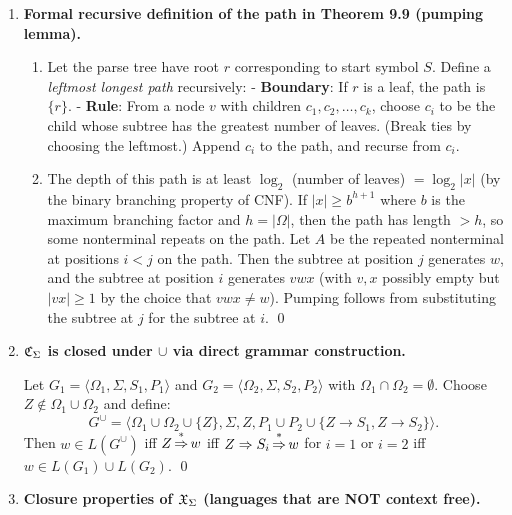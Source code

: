 \begin{enumerate}[{9.}1. ]
\textbf{Grammar}: $S \to \pmb{0}S\pmb{1} \mid \pmb{1}S\pmb{0} \mid SS \mid \lambda$.

\textbf{Proof}: By induction, any string with equal numbers of $\pmb{0}$s and $\pmb{1}$s is derivable, and all derivations yield strings with equal counts. So $L(G) = L$. \qed

\item \textbf{Formal recursive definition of the path in Theorem 9.9 (pumping lemma).}

\begin{enumerate}
\item Let the parse tree have root $r$ corresponding to start symbol $S$. Define a \emph{leftmost longest path} recursively:
  - \textbf{Boundary}: If $r$ is a leaf, the path is $\{r\}$.
  - \textbf{Rule}: From a node $v$ with children $c_1, c_2, \ldots, c_k$, choose $c_i$ to be the child whose subtree has the greatest number of leaves. (Break ties by choosing the leftmost.) Append $c_i$ to the path, and recurse from $c_i$.

\item The depth of this path is at least $\log_2$ (number of leaves) $= \log_2 |x|$ (by the binary branching property of CNF). If $|x| \geq b^{h+1}$ where $b$ is the maximum branching factor and $h = |\Omega|$, then the path has length $> h$, so some nonterminal repeats on the path. Let $A$ be the repeated nonterminal at positions $i < j$ on the path. Then the subtree at position $j$ generates $w$, and the subtree at position $i$ generates $vwx$ (with $v,x$ possibly empty but $|vx|\geq 1$ by the choice that $vwx \neq w$). Pumping follows from substituting the subtree at $j$ for the subtree at $i$. \qed
\end{enumerate}

\item \textbf{$\mathfrak{C}_\Sigma$ is closed under $\cup$ via direct grammar construction.}

Let $G_1 = \langle\Omega_1,\Sigma,S_1,P_1\rangle$ and $G_2 = \langle\Omega_2,\Sigma,S_2,P_2\rangle$ with $\Omega_1\cap\Omega_2=\emptyset$. Choose $Z \notin \Omega_1\cup\Omega_2$ and define:
\[
G^\cup = \langle\Omega_1\cup\Omega_2\cup\{Z\},\Sigma,Z,P_1\cup P_2\cup\{Z\to S_1,Z\to S_2\}\rangle.
\]
Then $w \in L(G^\cup)$ iff $Z \operatorname{\overset{*}{\Rightarrow}} w$ iff $Z \Rightarrow S_i \operatorname{\overset{*}{\Rightarrow}} w$ for $i=1$ or $i=2$ iff $w \in L(G_1)\cup L(G_2)$. \qed

\item \textbf{Closure properties of $\mathfrak{X}_\Sigma$ (languages that are NOT context free).}


\end{enumerate}
